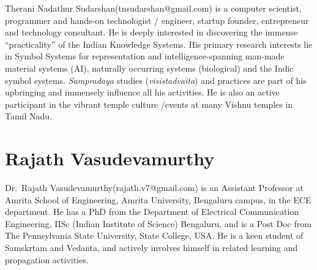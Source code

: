 Therani Nadathur Sudarshan(tnsudarshan@gmail.com) is a computer scientist, programmer and hands-on technologist / engineer, startup founder, entrepreneur and technology consultant. He is deeply interested in discovering the immense “practicality” of the Indian Knowledge Systems. His primary research interests lie in Symbol Systems for representation and intelligence-spanning man-made material systems (AI), naturally occurring systems (biological) and the Indic symbol systems. {\sl Sampradaya} studies ({\sl visistadvaita}) and practices are part of his upbringing and immensely influence all his activities. He is also an active participant in the vibrant temple culture /events at many Vishnu temples in Tamil Nadu.

\section*{Rajath Vasudevamurthy}

Dr.~Rajath Vasudevamurthy(rajath.v7@gmail.com) is an Assistant Professor at Amrita School of Engineering, Amrita University, Bengaluru campus, in the ECE department. He has a PhD from the Department of Electrical Communication Engineering, IISc (Indian Institute of Science) Bengaluru, and is a Post Doc from The Pennsylvania State University, State College, USA. He is a keen student of Samskrtam and Vedanta, and actively involves himself in related learning and propagation activities.

